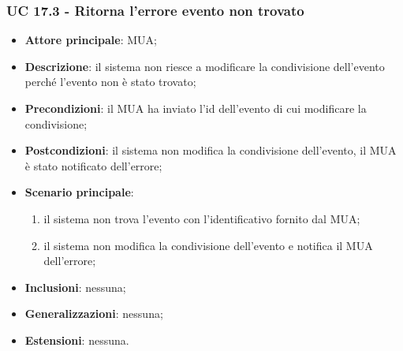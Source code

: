 \subsubsection{UC 17.3 - Ritorna l'errore evento non trovato} \label{sec:UC17.3}
    \begin{itemize}
        \item \textbf{Attore principale}: MUA;
        \item \textbf{Descrizione}: il sistema non riesce a modificare la condivisione dell'evento perché l'evento non è stato trovato;
        \item \textbf{Precondizioni}: il MUA ha inviato l'id dell'evento di cui modificare la condivisione;
        \item \textbf{Postcondizioni}: il sistema non modifica la condivisione dell'evento, il MUA è stato notificato dell'errore;
        \item \textbf{Scenario principale}:
            \begin{enumerate}
                \item il sistema non trova l'evento con l'identificativo fornito dal MUA;
                \item il sistema non modifica la condivisione dell'evento e notifica il MUA dell'errore;
            \end{enumerate}
        \item \textbf{Inclusioni}: nessuna;
        \item \textbf{Generalizzazioni}: nessuna;
        \item \textbf{Estensioni}: nessuna.
    \end{itemize}

